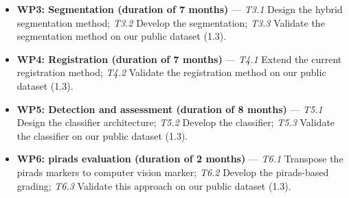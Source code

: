 \begin{itemize}[noitemsep]
\item[] \textbf{WP3: Segmentation (duration of 7 months)} ---
  \textit{T3.1} Design the hybrid segmentation method;
  \textit{T3.2} Develop the segmentation;
  \textit{T3.3} Validate the segmentation method on our public dataset (1.3).
\item[] \textbf{WP4: Registration (duration of 7 months)} ---
  \textit{T4.1} Extend the current registration method;
  \textit{T4.2} Validate the registration method on our public dataset (1.3).
\item[] \textbf{WP5: Detection and assessment (duration of 8 months)} ---
  \textit{T5.1} Design the classifier architecture;
  \textit{T5.2} Develop the classifier;
  \textit{T5.3} Validate the classifier on our public dataset (1.3).
\item[] \textbf{WP6: \ac{pirads} evaluation (duration of 2 months)} ---
  \textit{T6.1} Transpose the \ac{pirads} markers to computer vision marker;
  \textit{T6.2} Develop the \ac{pirads}-based grading;
  \textit{T6.3} Validate this approach on our public dataset (1.3).

\end{itemize}
